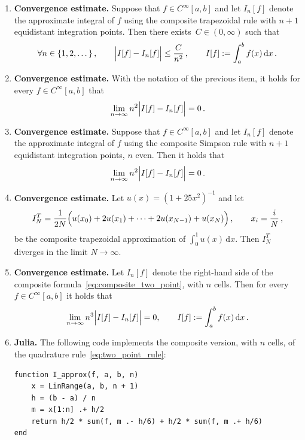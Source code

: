 \documentclass[a4paper]{article}
\renewcommand{\d}{\mathrm d}
\begin{document}
\begin{enumerate}
    \item
        \textbf{Convergence estimate.}
        Suppose that $f \in C^{\infty}[a, b]$ and let $I_n[f]$ denote the approximate integral of $f$ using the composite trapezoidal rule
        with $n+1$ equidistant integration points.
        Then there exists~$C \in (0, \infty)$ such that
        \[
             \forall n \in \{1, 2, \dotsc \}\,, \qquad
             \Bigl\lvert I[f] - I_n[f] \Bigr\rvert \leq \frac{C}{n^2}\,, \qquad I[f] := \int_{a}^{b} f(x) \, \d x\,.
        \]

    \item
        \textbf{Convergence estimate.}
        With the notation of the previous item, it holds for every $f \in C^{\infty}[a, b]$ that
        \[
             \lim_{n \to \infty} n^2 \Bigl\lvert I[f] - I_n[f] \Bigr\rvert = 0\,.
        \]

    \item
        \textbf{Convergence estimate.}
        Suppose that $f \in C^{\infty}[a, b]$ and let $I_n[f]$ denote the approximate integral of $f$ using the composite Simpson rule
        with $n+1$ equidistant integration points, $n$ even.
        Then it holds that
        \[
            \lim_{n \to \infty} n^2 \Bigl\lvert I[f] - I_n[f] \Bigr\rvert = 0\,.
        \]

    \item
        \textbf{Convergence estimate.}
        Let $u(x) = (1 + 25 x^2)^{-1}$ and let
        \[
            I^T_N = \frac{1}{2N} \Bigl( u(x_0) + 2 u(x_1) + \dotsb + 2 u(x_{N-1}) + u(x_N) \Bigr)\,, \qquad x_i = \frac{i}{N}\,,
        \]
        be the composite trapezoidal approximation of $\int_0^1 u(x) \, \d x$.
        Then $I^T_N$ diverges in the limit $N \to \infty$.

    \item
        \textbf{Convergence estimate.}
        Let $I_n[f]$ denote the right-hand side of the composite formula~\eqref{eq:composite_two_point}, with $n$ cells.
        Then for every $f \in C^{\infty}[a, b]$ it holds that
        \[
            \lim_{n \to \infty} n^3 \Bigl\lvert I[f] - I_n[f] \Bigr\rvert = 0, \qquad I[f] := \int_{a}^{b} f(x) \, \d x\,.
        \]

    \item
        \textbf{Julia.}
        The following code implements the composite version, with $n$ cells, of the quadrature rule~\eqref{eq:two_point_rule}:
        \begin{verbatim}
function I_approx(f, a, b, n)
    x = LinRange(a, b, n + 1)
    h = (b - a) / n
    m = x[1:n] .+ h/2
    return h/2 * sum(f, m .- h/6) + h/2 * sum(f, m .+ h/6)
end
        \end{verbatim}


\end{enumerate}
\end{document}
